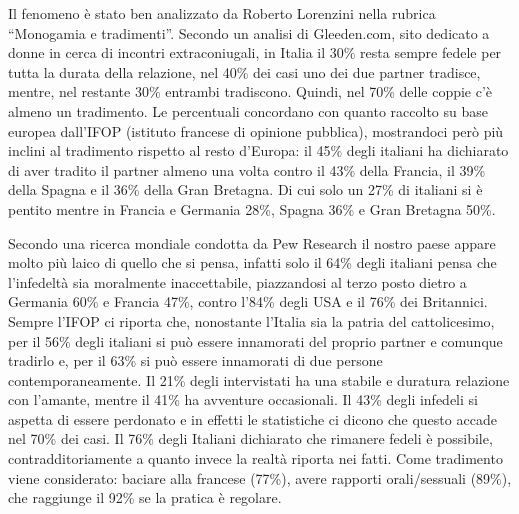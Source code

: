 \documentclass[12pt]{book} %
\begin{document}
Il fenomeno è stato ben analizzato da Roberto Lorenzini nella rubrica “Monogamia e tradimenti”. Secondo un analisi di
Gleeden.com, sito dedicato a donne in cerca di incontri extraconiugali, in Italia il 30\% resta sempre fedele per tutta
la durata della relazione, nel 40\% dei casi uno dei due partner tradisce, mentre, nel restante 30\% entrambi
tradiscono. Quindi, nel 70\% delle coppie c'è almeno un tradimento. Le percentuali concordano con
quanto raccolto su base europea dall'IFOP (istituto francese di opinione pubblica), mostrandoci
però più inclini al tradimento rispetto al resto d'Europa: il 45\% degli italiani ha dichiarato di
aver tradito il partner almeno una volta contro il 43\% della Francia, il 39\% della Spagna e il 36\% della Gran
Bretagna. Di cui solo un 27\% di italiani si è pentito mentre in Francia e Germania 28\%, Spagna 36\% e Gran Bretagna
50\%. 

Secondo una ricerca mondiale condotta da Pew
Research il nostro paese appare molto più laico di quello che si pensa, infatti solo il 64\% degli italiani pensa che
l'infedeltà sia moralmente inaccettabile, piazzandosi al terzo posto dietro a Germania 60\% e
Francia 47\%, contro l'84\% degli USA e il 76\% dei Britannici. Sempre l'IFOP
ci riporta che, nonostante l'Italia sia la patria del cattolicesimo, per il 56\% degli italiani si
può essere innamorati del proprio partner e comunque tradirlo e, per il 63\% si può essere innamorati di due persone
contemporaneamente. Il 21\% degli intervistati ha una stabile e duratura relazione con l'amante,
mentre il 41\% ha avventure occasionali. Il 43\% degli infedeli si aspetta di essere perdonato e in effetti le
statistiche ci dicono che questo accade nel 70\% dei casi. Il 76\% degli Italiani dichiarato che rimanere fedeli è
possibile, contradditoriamente a quanto invece la realtà riporta nei fatti. Come tradimento viene considerato: baciare
alla francese (77\%), avere rapporti orali/sessuali (89\%), che raggiunge il 92\% se la pratica è regolare. 
\newline
\newline
\end{document}
